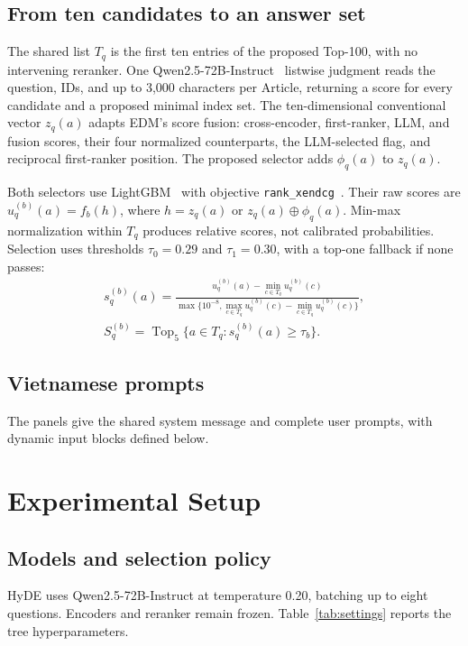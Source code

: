\documentclass[runningheads,a4paper]{llncs}
\begin{document}
\subsection{From ten candidates to an answer set}
The shared list $T_q$ is the first ten entries of the proposed Top-100, with no intervening reranker. One Qwen2.5-72B-Instruct~\cite{qwen2025qwen25} listwise judgment reads the question, IDs, and up to 3,000 characters per Article, returning a score for every candidate and a proposed minimal index set. The ten-dimensional conventional vector $z_q(a)$ adapts EDM's score fusion: cross-encoder, first-ranker, LLM, and fusion scores, their four normalized counterparts, the LLM-selected flag, and reciprocal first-ranker position. The proposed selector adds $\phi_q(a)$ to $z_q(a)$.

Both selectors use LightGBM~\cite{ke2017lightgbm} with objective \texttt{rank\_xendcg}~\cite{bruch2021xendcg}. Their raw scores are $u_q^{(b)}(a)=f_b(h)$, where $h=z_q(a)$ or $z_q(a)\oplus\phi_q(a)$. Min-max normalization within $T_q$ produces relative scores, not calibrated probabilities. Selection uses thresholds $\tau_0=0.29$ and $\tau_1=0.30$, with a top-one fallback if none passes:
\begin{equation}
 \begin{gathered}
 s_q^{(b)}(a)=\frac{u_q^{(b)}(a)-\min_{c\in T_q}u_q^{(b)}(c)}
 {\max\{10^{-8},\max_{c\in T_q}u_q^{(b)}(c)-\min_{c\in T_q}u_q^{(b)}(c)\}},\\[3pt]
 S_q^{(b)}=\operatorname{Top}_{5}\{a\in T_q:s_q^{(b)}(a)\geq\tau_b\}.
 \end{gathered}
 \label{eq:select}
\end{equation}

\subsection{Vietnamese prompts}
The panels give the shared system message and complete user prompts, with dynamic input blocks defined below.


\clearpage

\begingroup
\setlength{\intextsep}{6pt}
\setlength{\textfloatsep}{6pt}
\section{Experimental Setup}
\subsection{Models and selection policy}
HyDE uses Qwen2.5-72B-Instruct at temperature 0.20, batching up to eight questions. Encoders and reranker remain frozen. Table~\ref{tab:settings} reports the tree hyperparameters.
\end{document}
